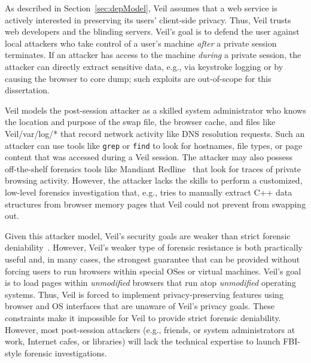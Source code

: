 As described in Section~\ref{sec:depModel}, Veil
assumes that a web service is actively interested
in preserving its users' client-side privacy.
Thus, Veil trusts web developers and the blinding servers.
Veil's goal is to defend the user against local
attackers who take control of a user's machine
\textit{after} a private session terminates. If an
attacker has access to the machine \emph{during} a
private session, the attacker can directly extract
sensitive data, e.g., via keystroke logging or by
causing the browser to core dump; such exploits are
out-of-scope for this dissertation.

Veil models the post-session attacker as a skilled
system administrator who knows the location and purpose
of the swap file, the browser cache, and files like
Veil{/var/log/*} that record network activity
like DNS resolution requests. Such an attacker can
use tools like \texttt{grep} or \texttt{find} to
look for hostnames, file types, or page content that
was accessed during a Veil session. The attacker
may also possess off-the-shelf forensics tools like
Mandiant Redline~\cite{mandiant} that look for traces
of private browsing activity. However, the attacker
lacks the skills to perform a customized, low-level
forensics investigation that, e.g., tries to manually
extract C++ data structures from browser memory
pages that Veil could not prevent from swapping out.

Given this attacker model, Veil's security goals are
weaker than strict forensic deniability~\cite{lacuna}.
However, Veil's weaker type of forensic resistance
is both practically useful and, in many cases, the
strongest guarantee that can be provided without
forcing users to run browsers within special OSes or
virtual machines. Veil's goal is to load pages within
\textit{unmodified} browsers that run atop
\textit{unmodified} operating systems. Thus, Veil
is forced to implement privacy-preserving features
using browser and OS interfaces that are unaware of
Veil's privacy goals. These constraints make it
impossible for Veil to provide strict forensic
deniability. However, most post-session attackers
(e.g., friends, or system administrators at work,
Internet cafes, or libraries) will
lack the technical expertise to launch FBI-style
forensic investigations.


